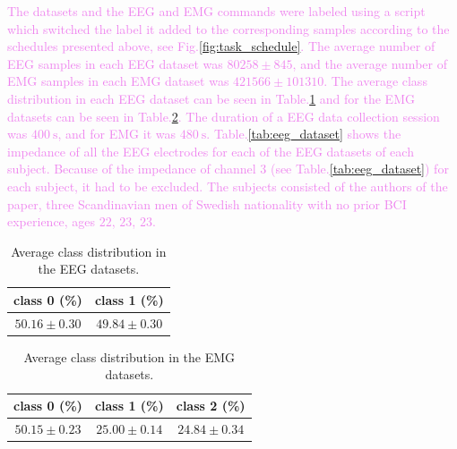 \textcolor{violet}{The datasets and the EEG and EMG commands were labeled using a script which switched the label it added to the corresponding samples according to the schedules presented above, see Fig.\:\ref{fig:task_schedule}.}
\textcolor{violet}{The average number of EEG samples in each EEG dataset was $80258 \pm 845$, and the average number of EMG samples in each EMG dataset was $421566 \pm 101310$.}
\textcolor{violet}{The average class distribution in each EEG dataset can be seen in Table.\:\ref{tab:eeg_class_distribution} and for the EMG datasets can be seen in Table.\:\ref{tab:emg_class_distribution}.}
\textcolor{violet}{The duration of a EEG data collection session was $400\:\text{s}$, and for EMG it was $480\:\text{s}$.}
\textcolor{violet}{Table.\:\ref{tab:eeg_dataset} shows the impedance of all the EEG electrodes for each of the EEG datasets of each subject. Because of the impedance of channel $3$ (see Table.\:\ref{tab:eeg_dataset}) for each subject, it had to be excluded.}
\textcolor{violet}{The subjects consisted of the authors of the paper, three Scandinavian men of Swedish nationality with no prior BCI experience, ages $22$, $23$, $23$.}

\begin{table}[ht]
    \centering
    \begin{tabular}{c|c}
         class 0 (\%)           & class 1 (\%)             \\ \hline
         $50.16 \pm 0.30$       & $49.84 \pm 0.30$
    \end{tabular}
    \caption{Average class distribution in the EEG datasets.}
    \label{tab:eeg_class_distribution}
\end{table}
\begin{table}[ht]
    \centering
    \begin{tabular}{c|c|c}
         class 0 (\%)           & class 1 (\%)          & class 2 (\%)            \\ \hline
         $50.15 \pm 0.23$       & $25.00 \pm 0.14$      & $24.84 \pm 0.34$
    \end{tabular}
    \caption{Average class distribution in the EMG datasets.}
    \label{tab:emg_class_distribution}
\end{table}


